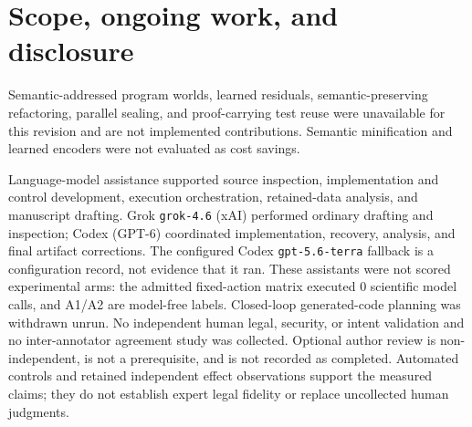 \documentclass{article}
\begin{document}
\section{Scope, ongoing work, and disclosure}

Semantic-addressed program worlds, learned residuals, semantic-preserving refactoring, parallel sealing, and proof-carrying test reuse were unavailable for this revision and are not implemented contributions. Semantic minification and learned encoders were not evaluated as cost savings.

Language-model assistance supported source inspection, implementation and control development, execution orchestration, retained-data analysis, and manuscript drafting. Grok \texttt{grok-4.6} (xAI) performed ordinary drafting and inspection; Codex (GPT-6) coordinated implementation, recovery, analysis, and final artifact corrections. The configured Codex \texttt{gpt-5.6-terra} fallback is a configuration record, not evidence that it ran. These assistants were not scored experimental arms: the admitted fixed-action matrix executed $0$ scientific model calls, and A1/A2 are model-free labels. Closed-loop generated-code planning was withdrawn unrun. No independent human legal, security, or intent validation and no inter-annotator agreement study was collected. Optional author review is non-independent, is not a prerequisite, and is not recorded as completed. Automated controls and retained independent effect observations support the measured claims; they do not establish expert legal fidelity or replace uncollected human judgments.

\clearpage

\end{document}
